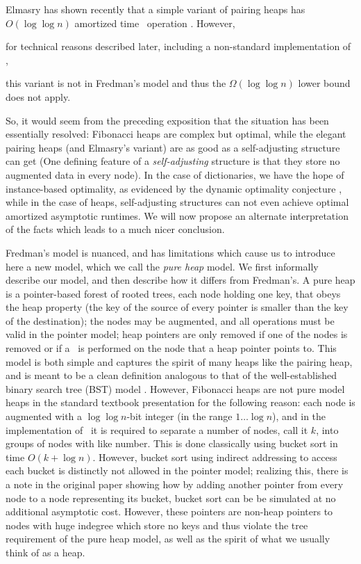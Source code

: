 Elmasry has shown recently that a simple variant of pairing heaps has $O(\log \log n)$ amortized time \opDc\ operation \cite{DBLP:conf/esa/Elmasry10,DBLP:conf/soda/Elmasry09}. However, 
\begin{fullonly}
for technical reasons described later, including a non-standard implementation of \opDc, 
\end{fullonly}
this variant is not in Fredman's model and thus the $\Omega(\log \log n)$ lower bound does not apply. 

So, it would seem from the preceding exposition that the situation has been essentially resolved: Fibonacci heaps are complex but optimal, while the elegant pairing heaps (and Elmasry's variant) are as good as a self-adjusting structure can get (One defining feature of a \emph{self-adjusting} structure is that they store no augmented data in every node). In the case of dictionaries, we have the hope of instance-based optimality, as evidenced by the dynamic optimality conjecture \cite{DBLP:journals/jacm/SleatorT85}, while in the case of heaps, self-adjusting structures can not even achieve optimal amortized asymptotic runtimes. We will now propose an alternate interpretation of the facts which leads to a much nicer conclusion.

Fredman's model is nuanced, and has limitations which cause us to introduce here a new model, which we call the \emph{pure heap} model. We first informally describe our model, and then describe how it differs from Fredman's.
A pure heap is a pointer-based forest of rooted trees, each node holding one key, that obeys the heap property (the key of the source of every pointer is smaller than the key of the destination); the nodes may be augmented, and all operations must be valid in the pointer model; heap pointers are only removed if one of the nodes is removed or if a \opDc\ is performed on the node that a heap pointer points to. 
This model is both simple and captures the spirit of many heaps  like the pairing heap, and is meant to be a clean definition analogous to that of the well-established binary search tree (BST) model \cite{DBLP:journals/siamcomp/Wilber89}.
However, Fibonacci heaps are not pure model heaps in the standard textbook presentation \cite{clrs} for the following reason: each node is augmented with a $\log \log n$-bit integer (in the range $1\ldots \log n$), and in the implementation of \opEm\ it is required to separate a number of nodes, call it $k$, into groups of nodes with like number. This is done classically using bucket sort in time $O(k+\log n)$. However, bucket sort using indirect addressing to access each bucket is distinctly not allowed in the pointer model; realizing this, there is a note in the original paper \cite{DBLP:journals/jacm/FredmanT87}  showing how by adding another pointer from every node to a node representing its bucket, bucket sort can be be simulated at no additional asymptotic cost. However, these pointers are non-heap pointers to nodes with huge indegree which store no keys and thus violate the tree requirement of the pure heap model, as well as the spirit of what we usually think of as a heap. 

